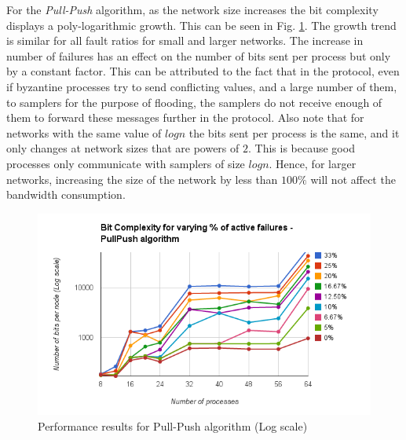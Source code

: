 For the \textit{Pull-Push} algorithm, as the network size increases the bit complexity displays a poly-logarithmic growth. This can be seen in Fig. \ref{fig:pull_push}. The growth trend is similar for all fault ratios for small and larger networks. The increase in number of failures has an effect on the number of bits sent per process but only by a constant factor. This can be attributed to the fact that in the protocol, even if byzantine processes try to send conflicting values, and a large number of them, to samplers for the purpose of flooding, the samplers do not receive enough of them to forward these messages further in the protocol. Also note that for networks with the same value of $logn$ the bits sent per process is the same, and it only changes at network sizes that are powers of $2$. This is because good processes only communicate with samplers of size $logn$. Hence, for larger networks, increasing the size of the network by less than $100\%$ will not affect the bandwidth consumption.
\begin{figure}[ht]
 \centering
\vspace{-1mm}
\includegraphics[scale=0.4]{pull_push}
\vspace{-1mm}
\caption{Performance results for Pull-Push algorithm (Log scale)}
 \label{fig:pull_push}
\vspace{-4mm}
\end{figure}

